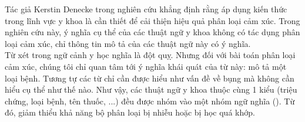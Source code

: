 Tác giả Kerstin Denecke trong nghiên cứu \cite{denecke2015sentiment} khẳng định rằng áp dụng kiến thức trong lĩnh vực y khoa là cần thiết để cải thiện hiệu quả phân loại cảm xúc. Trong nghiên cứu này, ý nghĩa cụ thể của các thuật ngữ y khoa không có tác dụng phân loại cảm xúc, chỉ thông tin mô tả của các thuật ngữ này có ý nghĩa.\\
Từ  xét trong ngữ cảnh y học nghĩa là đột quỵ. Nhưng đối với bài toán phân loại cảm xúc, chúng tôi chỉ quan tâm tới ý nghĩa khái quát của từ này:  mô tả một loại bệnh. Tương tự các từ  chỉ cần được hiểu như vấn đề về bụng mà không cần hiểu cụ thể như thế nào. Như vậy, các thuật ngữ y khoa thuộc cùng 1 kiểu (triệu chứng, loại bệnh, tên thuốc, ...) đều được nhóm vào một nhóm ngữ nghĩa (). Từ đó, giảm thiểu khả năng bộ phân loại bị nhiễu hoặc bị học quá khớp.\\

